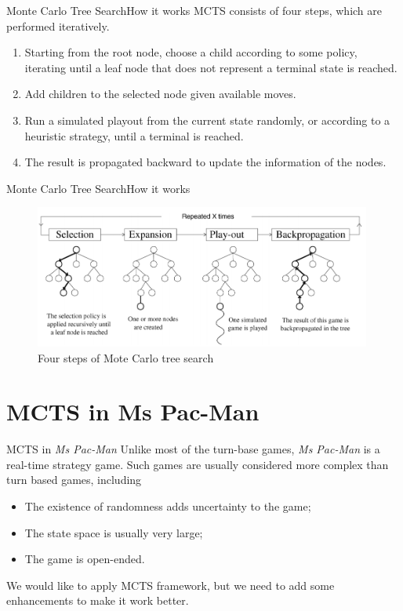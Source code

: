 \documentclass{beamer}
\begin{document}
  \begin{frame}{Monte Carlo Tree Search}{How it works}
  MCTS consists of four steps, which are performed iteratively.
  \begin{enumerate}
    \item Starting from the root node, choose a child according to some policy, iterating until a leaf node that does not represent a terminal state is reached.
    \item Add children to the selected node given available moves.
    \item Run a simulated playout from the current state randomly, or according to a heuristic strategy, until a terminal is reached.
    \item The result is propagated backward to update the information of the nodes.
  \end{enumerate}
  \end{frame}

  \begin{frame}{Monte Carlo Tree Search}{How it works}
    \begin{figure}
      \includegraphics[height = 4.7cm]{mcts_steps.png}
      \caption{Four steps of Mote Carlo tree search}
    \end{figure}
  \end{frame}

  \section{MCTS in Ms Pac-Man}
  \begin{frame}{MCTS in \textit{Ms Pac-Man}}
    Unlike most of the turn-base games, \textit{Ms Pac-Man} is a real-time strategy game. Such games are usually considered more complex than turn based games, including
    \begin{itemize}
      \item The existence of randomness adds uncertainty to the game;
      \item The state space is usually very large;
      \item The game is open-ended.
    \end{itemize}
    \pause
    We would like to apply MCTS framework, but we need to add some enhancements to make it work better.
  \end{frame}
\end{document}
